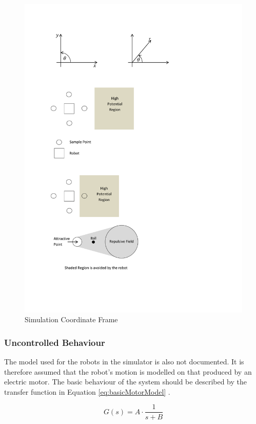 \documentclass[10pt]{article}
\begin{document}
\begin{figure}
 \centering
 \includegraphics[trim=2cm 23.5cm 13cm 2cm, clip=true]{Images/illustrations}
 \caption{Simulation Coordinate Frame}
 \label{fig:simCoordinateFrame}
\end{figure}

\subsubsection{Uncontrolled Behaviour}

The model used for the robots in the simulator is also not documented. It is
therefore assumed that the robot's motion is modelled on that produced by an
electric motor. The basic behaviour of the system should be described by the
transfer function in Equation \ref{eq:basicMotorModel} \cite{basicControlNotes}.

\begin{equation}
 \label{eq:basicMotorModel}
 G\left(s\right) = A \cdot \frac{1}{s+B}
\end{equation}
\end{document}
